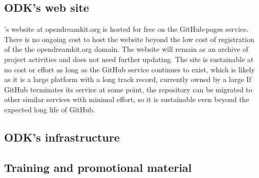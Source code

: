 \documentclass{deliverablereport}
\begin{document}
\subsection{ODK's web site}

\ODK's website at opendreamkit.org is hosted for free on the GitHub-pages service.
There is no ongoing cost to host the website beyond the low cost of registration of the the opendreamkit.org domain.
The \ODK website will remain as an archive of project activities and does not need further updating.
The site is sustainable at no cost or effort as long as the GitHub service continues to exist,
which is likely as it is a large platform with a long track record, currently owned by a large
If GitHub terminates its service at some point,
the repository can be migrated to other similar services with minimal effort,
so it is sustainable even beyond the expected long life of GitHub.


\subsection{ODK's infrastructure}


\subsection{Training and promotional material}

\printbibliography
\end{document}
